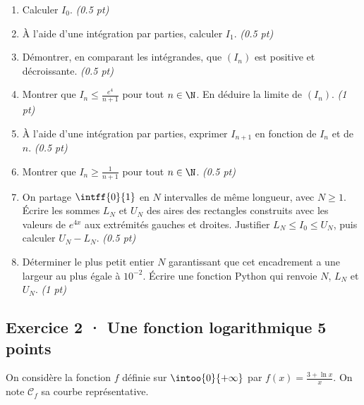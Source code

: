 \begin{enumerate}

\item Calculer $I_0$. \hfill\textit{(\num{0,5} pt)}

\item À l'aide d'une intégration par parties, calculer $I_1$. \hfill\textit{(\num{0,5} pt)}

\item Démontrer, en comparant les intégrandes, que $(I_n)$ est positive et décroissante. \hfill\textit{(\num{0,5} pt)}

\item Montrer que $I_n\le\frac{e^{4}}{n+1}$ pour tout $n\in\N$. En déduire la limite de $(I_n)$. \hfill\textit{(1 pt)}

\item À l'aide d'une intégration par parties, exprimer $I_{n+1}$ en fonction de $I_n$ et de $n$. \hfill\textit{(\num{0,5} pt)}

\item Montrer que $I_n\ge\frac1{n+1}$ pour tout $n\in\N$. \hfill\textit{(\num{0,5} pt)}

\item On partage $\intff{0}{1}$ en $N$ intervalles de même longueur, avec $N\ge1$. Écrire les sommes $L_N$ et $U_N$ des aires des rectangles construits avec les valeurs de $e^{4x}$ aux extrémités gauches et droites. Justifier $L_N\le I_0\le U_N$, puis calculer $U_N-L_N$. \hfill\textit{(\num{0,5} pt)}

\item Déterminer le plus petit entier $N$ garantissant que cet encadrement a une largeur au plus égale à $10^{-2}$. Écrire une fonction Python qui renvoie $N$, $L_N$ et $U_N$. \hfill\textit{(1 pt)}

\end{enumerate}

\subsection*{Exercice 2 · Une fonction logarithmique \hfill 5 points}On considère la fonction $f$ définie sur $\intoo{0}{+\infty}$ par $f(x)=\frac{3+\ln x}x$. On note $\mathcal C_f$ sa courbe représentative.


